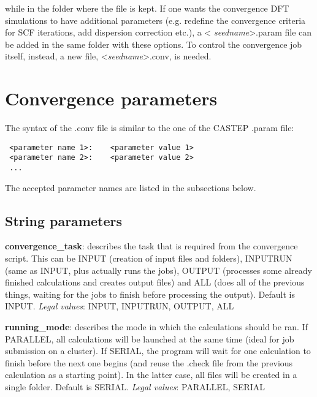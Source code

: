 \documentclass[10pt]{article}
\begin{document}
while in the folder where the file is kept. If one wants the convergence DFT 
simulations to have additional parameters (e.g. redefine the convergence 
criteria for SCF iterations, add dispersion correction etc.), a \textless 
\textit{seedname}\textgreater.param file can be added in the same folder with 
these options. To control the convergence job itself, instead, a new file, 
\textless \textit{seedname}\textgreater.conv, is needed.

\section{Convergence parameters}

The syntax of the .conv file is similar to the one of the CASTEP .param file:

\begin{lstlisting}
 <parameter name 1>:    <parameter value 1>
 <parameter name 2>:    <parameter value 2>
 ...
\end{lstlisting}

The accepted parameter names are listed in the subsections below.

\subsection{String parameters}

\textbf{convergence\_task}: describes the task that is required from the 
convergence script. This can be INPUT (creation of input files and folders), 
INPUTRUN (same as INPUT, plus actually runs the jobs), OUTPUT (processes some 
already finished calculations and creates output files) and ALL (does all of the 
previous things, waiting for the jobs to finish before processing the output). 
Default is INPUT.\newline
\textit{Legal values}: INPUT, INPUTRUN, OUTPUT, ALL\newline

\textbf{running\_mode}: describes the mode in which the calculations should be 
ran. If PARALLEL, all calculations will be launched at the same time (ideal for 
job submission on a cluster). If SERIAL, the program will wait for one 
calculation to finish before the next one begins (and reuse the .check file from 
the previous calculation as a starting point). In the latter case, all files 
will be created in a single folder. Default is SERIAL.\newline
\textit{Legal values}: PARALLEL, SERIAL\newline
\end{document}
